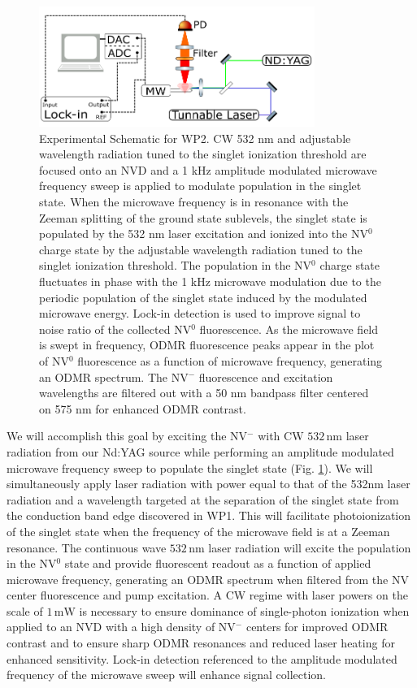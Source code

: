 \documentclass[11pt]{article}
\newcommand{\unit}[1]{\ensuremath{\, \mathrm{#1}}}
\begin{document}
\begin{figure}[h]
\centering
\includegraphics[width=0.8\textwidth]{Figures/WP2Schematic.png}
\caption{Experimental Schematic for WP2. CW 532 nm and adjustable wavelength radiation tuned to the singlet ionization threshold are focused onto an NVD and a 1 kHz amplitude modulated microwave frequency sweep is applied to modulate population in the singlet state.  When the microwave frequency is in resonance with the Zeeman splitting of the ground state sublevels, the singlet state is populated by the 532 nm laser excitation and ionized into the NV$^0$ charge state by the adjustable wavelength radiation tuned to the singlet ionization threshold.  The population in the NV$^0$ charge state fluctuates in phase with the 1 kHz microwave modulation due to the periodic population of the singlet state induced by the modulated microwave energy.  Lock-in detection is used to improve signal to noise ratio of the collected NV$^0$ fluorescence.  As the microwave field is swept in frequency, ODMR fluorescence peaks appear in the plot of NV$^0$ fluorescence as a function of microwave frequency, generating an ODMR spectrum.  The NV$^-$ fluorescence and excitation wavelengths are filtered out with a 50 nm bandpass filter centered on 575 nm for enhanced ODMR contrast.}
\label{WP2Schematic}
\end{figure}

We will accomplish this goal by exciting the NV$^-$ with CW $532\unit{nm}$ laser radiation from our
Nd:YAG source while performing an amplitude modulated microwave frequency sweep to populate the singlet
state (Fig. \ref{WP2Schematic}).  We will simultaneously apply laser radiation with power equal to that of the 532nm
laser radiation and a wavelength targeted at the separation of the singlet state from the conduction
band edge discovered in WP1.  This will facilitate photoionization of the singlet state when the
frequency of the microwave field is at a Zeeman resonance.  The continuous wave $532\unit{nm}$ laser radiation
will excite the population in the NV$^0$  state and provide fluorescent readout as a function of applied
microwave frequency, generating an ODMR spectrum when filtered from the NV center fluorescence and pump
excitation.  A CW regime with laser powers on the scale of $1\unit{mW}$ is necessary to ensure dominance of
single-photon ionization when applied to an NVD with a high density of NV$^-$ centers for improved ODMR contrast and to ensure sharp ODMR resonances and reduced
laser heating for enhanced sensitivity.  Lock-in detection referenced to the amplitude modulated
frequency of the microwave sweep will enhance signal collection.
\end{document}
